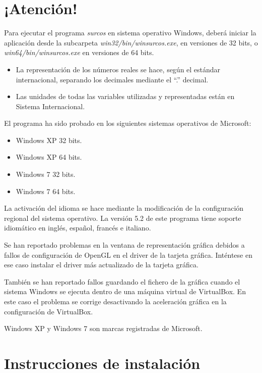 \chapter*{¡Atención!}

Para ejecutar el programa \emph{surcos} en sistema operativo Windows, deberá
iniciar la aplicación desde la subcarpeta \emph{win32/bin/winsurcos.exe}, en
versiones de 32 bits, o \emph{win64/bin/winsurcos.exe} en versiones de 64 bits.

\begin{itemize}
\item La representación de los números reales se hace, según el estándar
internacional, separando los decimales mediante el ``.'' decimal.
\item Las unidades de todas las variables utilizadas y representadas están en
Sistema Internacional.
\end{itemize}

El programa ha sido probado en los siguientes sistemas operativos de Microsoft:
\begin{itemize}
\item Windows XP 32 bits.
\item Windows XP 64 bits.
\item Windows 7 32 bits.
\item Windows 7 64 bits.
\end{itemize}

La activación del idioma se hace mediante la modificación de la configuración
regional del sistema operativo. La versión 5.2 de este programa tiene soporte
idiomático en inglés, español, francés e italiano. 

Se han reportado problemas en la ventana de representación gráfica debidos a
fallos de configuración de OpenGL en el driver de la tarjeta gráfica. Inténtese
en ese caso instalar el driver más actualizado de la tarjeta gráfica.

También se han reportado fallos guardando el fichero de la gráfica cuando el
sistema Windows se ejecuta dentro de una máquina virtual de VirtualBox. En este
caso el problema se corrige desactivando la aceleración gráfica en la
configuración de VirtualBox.

Windows XP y Windows 7 son marcas registradas de Microsoft.

\setcounter{page}{1}

\chapter{Instrucciones de instalación}

